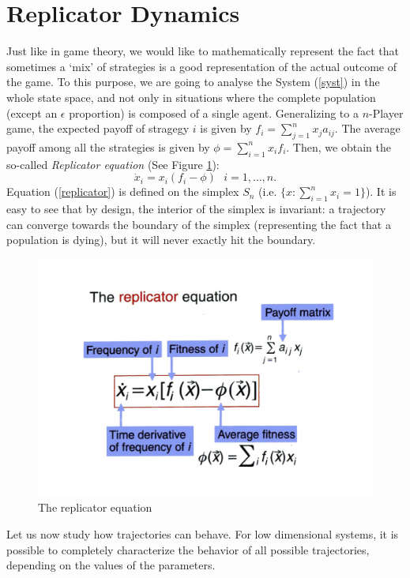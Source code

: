 \section{Replicator Dynamics}
Just like in game theory, we would like to mathematically represent the fact that sometimes a `mix' of strategies is a good representation of the actual outcome of the game.  To this purpose, we are going to analyse the System (\ref{syst}) in the whole state space, and not only in situations where the complete population (except an $\epsilon$  proportion) is composed of a single agent. Generalizing to a $n$-Player game, the expected payoff of stragegy $i$ is given by $f_i = \sum\limits_{j=1}^{n}x_j a_{ij}.$  The average payoff among all the strategies is given by $\phi = \sum\limits_{i=1}^{n}x_i f_i.$ Then, we obtain the so-called \emph{Replicator equation} (See Figure \ref{imrepli}): 
\begin{equation}
\dot{x}_i = x_i (f_i - \phi)~~~i=1,\dots ,n. \label{replicator}
\end{equation}
Equation (\ref{replicator}) is defined on the simplex $S_n$ (i.e. $\{x: \sum\limits_{i=1}^{n} x_i =1\}$).  It is easy to see that by design, the interior of the simplex is invariant: a trajectory can converge towards the boundary of the simplex (representing the fact that a population is dying), but it will never exactly hit the boundary.
\begin{figure}[hbtp]
\centering
\includegraphics[scale=0.3]{im5.png}
\caption{The replicator equation}\label{imrepli}
\end{figure}
Let us now study how trajectories can behave.  For low dimensional systems, it is possible to completely characterize the behavior of all possible trajectories, depending on the values of the parameters.
